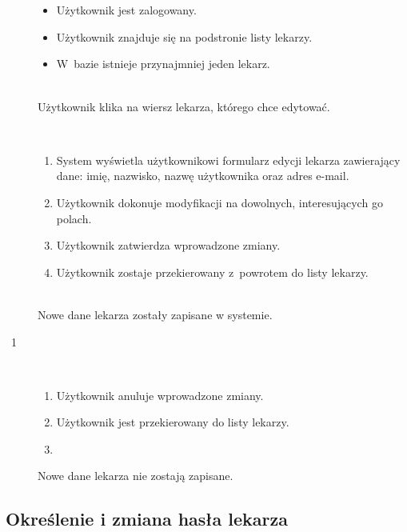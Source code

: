 \documentclass[11pt]{aghdpl}
\begin{document}
	\begin{description}
		\item[\useCaseAktor] \hfill \\
			\useCaseUzytkownik
		\item[\useCaseWarPocz] \hfill \\
			\begin{itemize}
				\item Użytkownik jest zalogowany.
				\item Użytkownik znajduje się na podstronie listy lekarzy.
				\item W~bazie istnieje przynajmniej jeden lekarz.
			\end{itemize}
		\item[\useCaseZdarzInicj] \hfill \\
			Użytkownik klika na wiersz lekarza, którego chce edytować.
		\item[\useCaseScenBaz] \hfill \\ 
			\begin{enumerate}
				\item System wyświetla użytkownikowi formularz edycji lekarza zawierający dane: imię, nazwisko, nazwę użytkownika oraz adres e-mail.
				\item Użytkownik dokonuje modyfikacji na dowolnych, interesujących go polach.
				\item Użytkownik zatwierdza wprowadzone zmiany.
				\item Użytkownik zostaje przekierowany z~powrotem do listy lekarzy.
			\end{enumerate}
		\item[\useCaseWarKonc] \hfill \\ 
			Nowe dane lekarza zostały zapisane w systemie.
		\item[\useCaseWyjatek~1] \hfill \\
			\begin{enumerate}[label=3a\arabic*.]
				\item Użytkownik anuluje wprowadzone zmiany.
				\item Użytkownik jest przekierowany do listy lekarzy.
				\item \useCaseEnd
			\end{enumerate}
			Nowe dane lekarza nie zostają zapisane.
	\end{description}

\subsection{Określenie i zmiana hasła lekarza}
\end{document}
